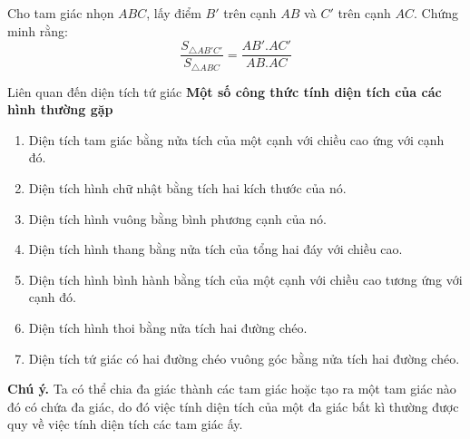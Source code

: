 \begin{bt}%
	Cho tam giác nhọn $ABC$, lấy điểm $B'$ trên cạnh $AB$ và $C'$ trên cạnh $AC$. Chứng minh rằng: $$\dfrac{S_{\triangle AB'C'}}{S_{\triangle ABC}}=\dfrac{AB'.AC'}{AB.AC}$$
\end{bt}

\begin{dang}{Liên quan đến diện tích tứ giác}
	\textbf{Một số công thức tính diện tích của các hình thường gặp}
	\begin{enumerate}
		\item Diện tích tam giác bằng nửa tích của một cạnh với chiều cao ứng với cạnh đó.		
		\item Diện tích hình chữ nhật bằng tích hai kích thước của nó.
		\item Diện tích hình vuông bằng bình phương cạnh của nó.
		\item Diện tích hình thang bằng nửa tích của tổng hai đáy với chiều cao.
		\item Diện tích hình bình hành bằng tích của một cạnh với chiều cao tương ứng với cạnh đó.
		\item Diện tích hình thoi bằng nửa tích hai đường chéo.
		\item Diện tích tứ giác có hai đường chéo vuông góc bằng nửa tích hai đường chéo.
	\end{enumerate}
	\begin{note}
		\textbf{Chú ý.} Ta có thể chia đa giác thành các tam giác hoặc tạo ra một tam giác nào đó có chứa đa giác, do đó việc tính diện tích của một đa giác bất kì thường được quy về việc tính diện tích các tam giác ấy.
	\end{note}
\end{dang}

